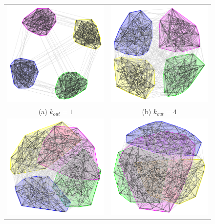 \begin{figure}
	\begin{tabular}{cc}
		\includegraphics[width=65mm]{images/girvan_kout_1_0.png} &   \includegraphics[width=65mm]{images/girvan_kout_4_0.png} \\
		(a) $k_{out}=1$ & (b) $k_{out}=4$ \\[6pt]
		\includegraphics[width=65mm]{images/girvan_kout_7_0.png} &   \includegraphics[width=65mm]{images/girvan_kout_8_0.png} \\

\end{tabular}
\end{figure}

